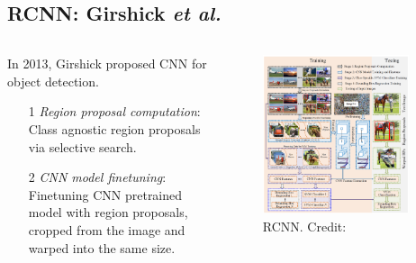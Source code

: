 \documentclass{beamer}
\begin{document}
\subsection{RCNN: Girshick \it{et al. \cite{girshick_rich_2014}}}
\begin{frame}{}
	\begin{columns}
		\begin{column}{0.5\textwidth}
			In 2013, Girshick proposed CNN for object detection.
			\begin{enumerate}
				\item[1] \emph{Region proposal computation}: Class agnostic region proposals via selective search.
				\item[2] \emph{CNN model finetuning}: Finetuning CNN pretrained model with region proposals, cropped from the image and warped into the same size.
			\end{enumerate}
		\end{column}
		\begin{column}{0.5\textwidth}
			\begin{figure}
				\centering
				\includegraphics[width=0.9\textwidth]{images/RCNN.PNG}
				\caption{RCNN.
				\hbox{\scriptsize Credit:}}
			\end{figure}
		\end{column}
	\end{columns}
\end{frame}
\end{document}
